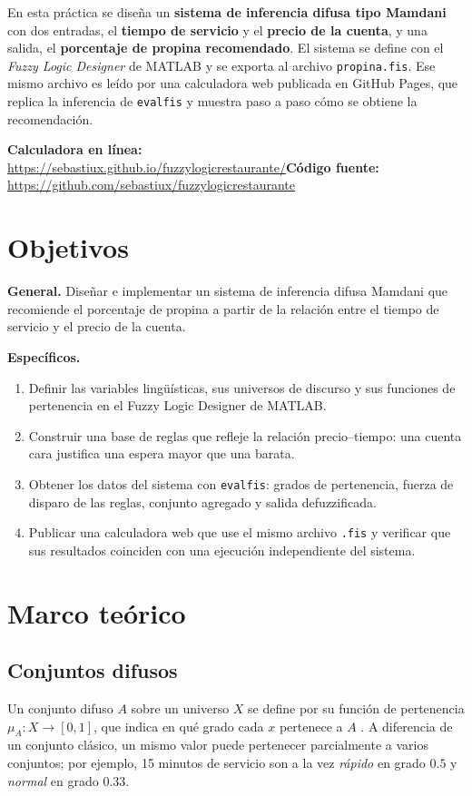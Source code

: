 \documentclass[11pt,letterpaper]{article}
\newcommand{\app}{\url{https://sebastiux.github.io/fuzzylogicrestaurante/}}
\newcommand{\repo}{\url{https://github.com/sebastiux/fuzzylogicrestaurante}}
\begin{document}
En esta práctica se diseña un \textbf{sistema de inferencia difusa tipo Mamdani} con dos entradas, el \textbf{tiempo de servicio} y el \textbf{precio de la cuenta}, y una salida, el \textbf{porcentaje de propina recomendado}. El sistema se define con el \emph{Fuzzy Logic Designer} de MATLAB y se exporta al archivo \texttt{propina.fis}. Ese mismo archivo es leído por una calculadora web publicada en GitHub Pages, que replica la inferencia de \texttt{evalfis} y muestra paso a paso cómo se obtiene la recomendación.

\begin{nota}
\textbf{Calculadora en línea:} \app\qquad \textbf{Código fuente:} \repo
\end{nota}

\section{Objetivos}

\textbf{General.} Diseñar e implementar un sistema de inferencia difusa Mamdani que recomiende el porcentaje de propina a partir de la relación entre el tiempo de servicio y el precio de la cuenta.

\textbf{Específicos.}
\begin{enumerate}[leftmargin=*]
  \item Definir las variables lingüísticas, sus universos de discurso y sus funciones de pertenencia en el Fuzzy Logic Designer de MATLAB.
  \item Construir una base de reglas que refleje la relación precio--tiempo: una cuenta cara justifica una espera mayor que una barata.
  \item Obtener los datos del sistema con \texttt{evalfis}: grados de pertenencia, fuerza de disparo de las reglas, conjunto agregado y salida defuzzificada.
  \item Publicar una calculadora web que use el mismo archivo \texttt{.fis} y verificar que sus resultados coinciden con una ejecución independiente del sistema.
\end{enumerate}

\section{Marco teórico}

\subsection{Conjuntos difusos}
Un conjunto difuso $A$ sobre un universo $X$ se define por su función de pertenencia $\mu_A : X \to [0,1]$, que indica en qué grado cada $x$ pertenece a $A$ \cite{zadeh}. A diferencia de un conjunto clásico, un mismo valor puede pertenecer parcialmente a varios conjuntos; por ejemplo, 15 minutos de servicio son a la vez \emph{rápido} en grado $0.5$ y \emph{normal} en grado $0.33$.
\end{document}
